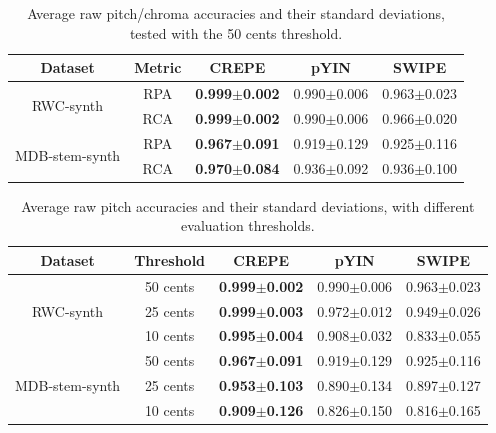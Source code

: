 \begin{table}[t]
	\begin{center}
		\begin{tabular}{c|c||c|c|c} \hline
			\multicolumn{1}{c}{Dataset} & \multicolumn{1}{c}{Metric} & \multicolumn{1}{c}{CREPE} & \multicolumn{1}{c}{pYIN} & \multicolumn{1}{c}{SWIPE} \\ \hline
			\multirow{2}{*}{RWC-synth} & RPA & \textbf{0.999$\pm$0.002} & 0.990$\pm$0.006& 0.963$\pm$0.023 \\ \cline{2-5}
			& RCA & \textbf{0.999$\pm$0.002} & 0.990$\pm$0.006& 0.966$\pm$0.020 \\ \hline \hline
			\multirow{2}{*}{MDB-stem-synth} & RPA & \textbf{0.967$\pm$0.091} & 0.919$\pm$0.129& 0.925$\pm$0.116 \\ \cline{2-5}
			& RCA & \textbf{0.970$\pm$0.084} & 0.936$\pm$0.092& 0.936$\pm$0.100 \\ \hline
		\end{tabular}
	\end{center}
	\caption{Average raw pitch/chroma accuracies and their standard deviations, tested with the 50 cents threshold.}
	\label{tbl:accuracy50}
\end{table}

\begin{table}[t]
	\begin{center}
		\begin{tabular}{c|c||c|c|c} \hline
			\multicolumn{1}{c}{Dataset} & \multicolumn{1}{c}{Threshold} &  \multicolumn{1}{c}{CREPE} & \multicolumn{1}{c}{pYIN} & \multicolumn{1}{c}{SWIPE} \\ \hline
			
			\multirow{3}{*}{RWC-synth} 
			& 50 cents & \textbf{0.999$\pm$0.002} & 0.990$\pm$0.006 & 0.963$\pm$0.023 \\ \cline{2-5}
			& 25 cents & \textbf{0.999$\pm$0.003} & 0.972$\pm$0.012 & 0.949$\pm$0.026 \\ \cline{2-5}
			& 10 cents & \textbf{0.995$\pm$0.004} & 0.908$\pm$0.032 & 0.833$\pm$0.055 \\ \hline \hline
			
			\multirow{3}{*}{MDB-stem-synth}
			& 50 cents & \textbf{0.967$\pm$0.091} & 0.919$\pm$0.129 & 0.925$\pm$0.116 \\ \cline{2-5}
			& 25 cents & \textbf{0.953$\pm$0.103} & 0.890$\pm$0.134 & 0.897$\pm$0.127 \\ \cline{2-5}
			& 10 cents & \textbf{0.909$\pm$0.126} & 0.826$\pm$0.150 & 0.816$\pm$0.165 \\ \hline
		\end{tabular}
	\end{center}
	\caption{Average raw pitch accuracies and their standard deviations, with different evaluation thresholds.}
	\label{tbl:thresholds}
\end{table}

